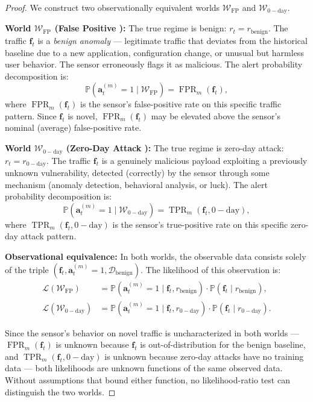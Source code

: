 \documentclass[11pt,a4paper]{article}
\theoremstyle{definition}
\theoremstyle{remark}
\DeclareMathOperator{\TPR}{TPR}
\DeclareMathOperator{\FPR}{FPR}
\newcommand{\Pbb}{\mathbb{P}}
\newcommand{\cD}{\mathcal{D}}
\newcommand{\FP}{\mathrm{FP}}
\newcommand{\zeroday}{\mathrm{0-day}}
\newcommand{\alertvec}{\mathbf{a}}
\newcommand{\flowvec}{\mathbf{f}}
\begin{document}
\begin{proof}
We construct two observationally equivalent worlds $\mathcal{W}_{\FP}$ and $\mathcal{W}_{\zeroday}$.

\textbf{World $\mathcal{W}_{\FP}$ (False Positive ):} The true regime is benign: $r_t = r_{\mathrm{benign}}$. The traffic $\flowvec_t$ is a \textit{benign anomaly} — legitimate traffic that deviates from the historical baseline due to a new application, configuration change, or unusual but harmless user behavior. The sensor erroneously flags it as malicious. The alert probability decomposition is:
\begin{equation}
\Pbb(\alertvec_t^{(m)} = 1 \mid \mathcal{W}_{\FP}) = \FPR_m(\flowvec_t),
\label{eq:W_FP}
\end{equation}
where $\FPR_m(\flowvec_t)$ is the sensor's false-positive rate on this specific traffic pattern. Since $\flowvec_t$ is novel, $\FPR_m(\flowvec_t)$ may be elevated above the sensor's nominal (average) false-positive rate.

\textbf{World $\mathcal{W}_{\zeroday}$ (Zero-Day Attack ):} The true regime is zero-day attack: $r_t = r_{\zeroday}$. The traffic $\flowvec_t$ is a genuinely malicious payload exploiting a previously unknown vulnerability, detected (correctly) by the sensor through some mechanism (anomaly detection, behavioral analysis, or luck). The alert probability decomposition is:
\begin{equation}
\Pbb(\alertvec_t^{(m)} = 1 \mid \mathcal{W}_{\zeroday}) = \TPR_m(\flowvec_t, \zeroday),
\label{eq:W_zeroday}
\end{equation}
where $\TPR_m(\flowvec_t, \zeroday)$ is the sensor's true-positive rate on this specific zero-day attack pattern.

\textbf{Observational equivalence:} In both worlds, the observable data consists solely of the triple $(\flowvec_t, \alertvec_t^{(m)} = 1, \cD_{\mathrm{benign}})$. The likelihood of this observation is:
\begin{align}
\mathcal{L}(\mathcal{W}_{\FP}) &= \Pbb(\alertvec_t^{(m)} = 1 \mid \flowvec_t, r_{\mathrm{benign}}) \cdot \Pbb(\flowvec_t \mid r_{\mathrm{benign}}), \\
\mathcal{L}(\mathcal{W}_{\zeroday}) &= \Pbb(\alertvec_t^{(m)} = 1 \mid \flowvec_t, r_{\zeroday}) \cdot \Pbb(\flowvec_t \mid r_{\zeroday}).
\end{align}

Since the sensor's behavior on novel traffic is uncharacterized in both worlds — $\FPR_m(\flowvec_t)$ is unknown because $\flowvec_t$ is out-of-distribution for the benign baseline, and $\TPR_m(\flowvec_t, \zeroday)$ is unknown because zero-day attacks have no training data — both likelihoods are unknown functions of the same observed data. Without assumptions that bound either function, no likelihood-ratio test can distinguish the two worlds.


\end{proof}
\end{document}
